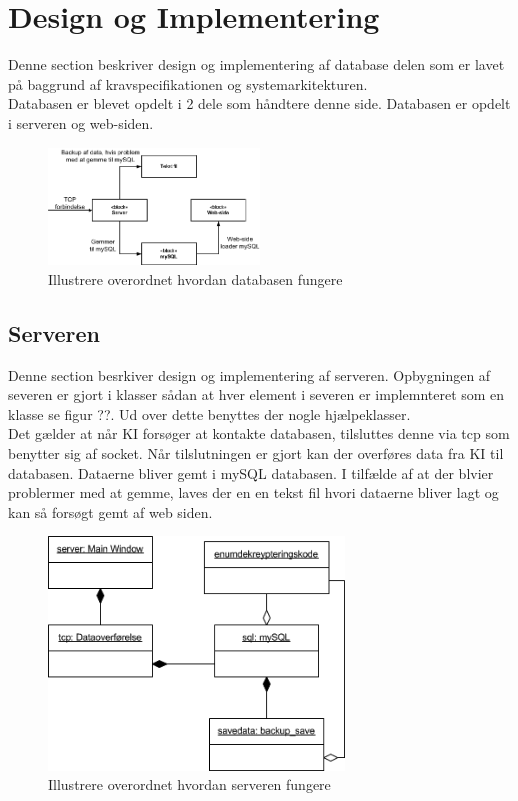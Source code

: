 \section{Design og Implementering}
Denne section beskriver design og implementering af database delen som er lavet på baggrund af kravspecifikationen og systemarkitekturen.\\
Databasen er blevet opdelt i 2 dele som håndtere denne side. Databasen er opdelt i serveren og web-siden.
\begin{figure}[H]
\centering
\includegraphics[width = 0.5\textwidth]{billeder/database_to_mysql}
\caption{Illustrere overordnet hvordan databasen fungere}
\label{fig:server_to_mysql}
\end{figure}

\subsection{Serveren}
Denne section besrkiver design og implementering af serveren.
Opbygningen af severen er gjort i klasser sådan at hver element i severen er implemnteret som en klasse se figur ??. Ud over dette benyttes der nogle hjælpeklasser.\\

Det gælder at når KI forsøger at kontakte databasen, tilsluttes denne via tcp som benytter sig af socket. Når tilslutningen er gjort kan der overføres data fra KI til databasen. Dataerne bliver gemt i mySQL databasen. I tilfælde af at der blvier problermer med at gemme, laves der en en tekst fil hvori dataerne bliver lagt og kan så forsøgt gemt af web siden.
\begin{figure}[H]
\centering
\includegraphics[width = 0.7\textwidth]{billeder/database_server}
\caption{Illustrere overordnet hvordan serveren fungere}
\label{fig:database_server}
\end{figure}
